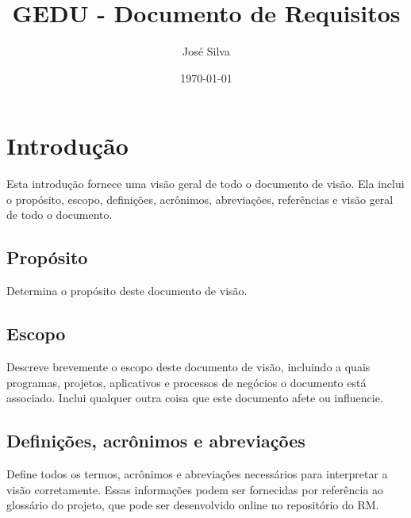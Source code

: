 \documentclass{report}
\title{GEDU - Documento de Requisitos}
\author{José Silva}
\date{\today}
\begin{document}
\thispagestyle{empty}
\maketitle
\newpage

\setcounter{page}{1}
\tableofcontents
\newpage

\listoffigures
\newpage

\listoftables
\newpage

\setcounter{page}{1}

\chapter{Introdução}


Esta introdução fornece uma visão geral de todo o documento de visão. Ela
inclui o propósito, escopo, definições, acrônimos, abreviações, referências e
visão geral de todo o documento.

\section{Propósito}

Determina o propósito deste documento de visão.

\section{Escopo}

Descreve brevemente o escopo deste documento de visão, incluindo a quais
programas, projetos, aplicativos e processos de negócios o documento está
associado. Inclui qualquer outra coisa que este documento afete ou influencie.

\section{Definições, acrônimos e abreviações}

Define todos os termos, acrônimos e abreviações necessários para interpretar a
visão corretamente. Essas informações podem ser fornecidas por referência ao
glossário do projeto, que pode ser desenvolvido online no repositório do RM.
\end{document}
